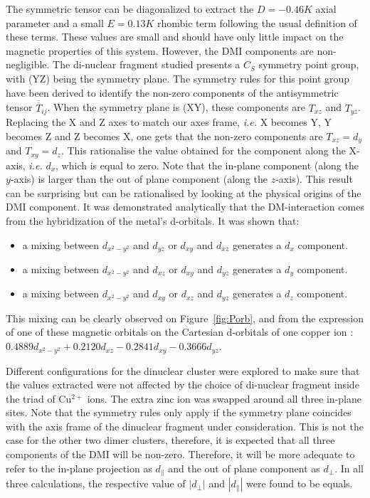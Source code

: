 \documentclass[12pt,a4paper]{report}
\numberwithin{equation}{section}
\begin{document}
The symmetric tensor can be diagonalized to extract the $ D = - 0.46 K $ axial parameter and a small $ E = 0.13 K$ rhombic term following the usual definition of these terms.
These values are small and should have only little impact on the magnetic properties of this system.
However, the DMI components are non-negligible. 
The di-nuclear fragment studied presents a $C_S$ symmetry point group, with (YZ) being the symmetry plane. 
The symmetry rules for this point group have been derived to identify the non-zero components of the antisymmetric tensor $\overline{\overline{T}}_{ij}$.\cite{buckingham_symmetry_1982,ruamps_interplay_2014}
When the symmetry plane is (XY), these components are $T_{xz}$ and $T_{yz}$.
Replacing the X and Z axes to match our axes frame, \textit{i.e.} X becomes Y, Y becomes Z and Z becomes X, one gets that the non-zero components are $T_{xz}=d_y$ and $T_{xy}=d_z$.
This rationalise the value obtained for the component along the X-axis, \textit{i.e.} $d_x$, which is equal to zero.
Note that the in-plane component (along the $y$-axis) is larger than the out of plane component (along the $z$-axis). 
This result can be surprising but can be rationalised by looking at the physical origins of the DMI component.
It was demonstrated analytically that the DM-interaction comes from the hybridization of the metal's d-orbitals. 
It was shown that:
\begin{itemize}
    \item a mixing between $ d_{x^2-y^2}$ and $ d_{yz}$ or $ d_{xy}$ and $d_{xz}$ generates a $ d_{x}$ component.
    \item a mixing between $d_{x^2-y^2}$ and $ d_{xz}$ or $ d_{xy}$ and $d_{yz}$ generates a $ d_{y}$ component.
    \item a mixing between $ d_{x^2-y^2}$ and $d_{xy}$ or $ d_{xz}$ and $d_{yz}$ generates a $ d_{z}$ component.
\end{itemize}

This mixing can be clearly observed on Figure~\ref{fig:Porb}, and from the expression of one of these magnetic orbitals on the Cartesian
d-orbitals of one copper ion : $0.4889d_{x^2-y^2}+0.2120d_{xz}-0.2841d_{xy}-0.3666d_{yz}$. 




Different configurations for the dinuclear cluster were explored to make sure that the values extracted were not affected by the choice of di-nuclear fragment inside the triad of Cu$^{2+}$ ions. 
The extra zinc ion was swapped around all three in-plane sites. 
Note that the symmetry rules only apply if the symmetry plane coincides with the axis frame of the dinuclear fragment under consideration.
This is not the case for the other two dimer clusters, therefore, it is expected that all three components of the DMI will be non-zero.
Therefore, it will be more adequate to refer to the in-plane projection as $d_{\parallel}$ and the out of plane component as $d_{\perp}$.
In all three calculations, the respective value of $|d_{\perp}|$ and $|d_{\parallel}|$ were found to be equals.
\end{document}
